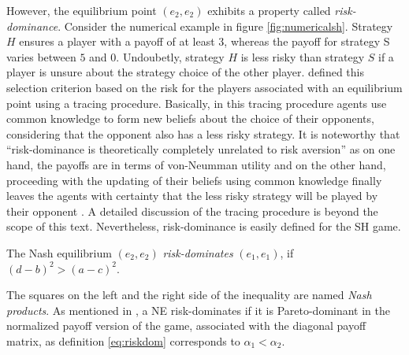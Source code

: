 However, the equilibrium point $(e_2,e_2)$ exhibits a property
called \textit{risk\hyp{}dominance}. 
Consider the numerical example in figure \ref{fig:numericalsh}. 
Strategy $H$ ensures a player with a payoff of at least $3$, whereas the 
payoff for strategy S varies between $5$ and $0$. Undoubetly, 
strategy $H$ is less risky than strategy $S$ if a player is unsure 
about the strategy choice of the other player.
\textcite{harsanyi_general_1988} defined this selection criterion 
based on the risk for the players associated with an 
equilibrium point using a tracing procedure. 
Basically, in this tracing procedure agents use common knowledge
to form new beliefs about the choice of their opponents, considering that
the opponent also has a less risky strategy.
It is noteworthy that ``risk-dominance is theoretically completely unrelated
to risk aversion'' as on one hand, the payoffs are in terms of von-Neumman
utility and on the other hand, proceeding with the updating of their beliefs
using common knowledge finally leaves the agents with certainty that the less 
risky strategy will be played by their opponent 
\parencite[341]{straub_risk_1995}.
A detailed discussion of the tracing procedure is beyond the scope of this
text. Nevertheless, risk-dominance is easily defined for the SH game.
\begin{mydef}
 \label{eq:riskdom}
The Nash equilibrium $(e_2,e_2)$ \textit{risk-dominates} 
$(e_1,e_1)$, if $(d-b)^2 > (a-c)^2$. \end{mydef}
The squares on the left and the right side of the inequality are named
\textit{Nash products}.
As mentioned in \textcite{weibull_evolutionary_1997}, a NE risk-dominates 
if it is Pareto-dominant in the normalized payoff version of the game, 
associated with the diagonal payoff matrix, 
as definition \eqref{eq:riskdom} corresponds to $\alpha_1 < \alpha_2$.

